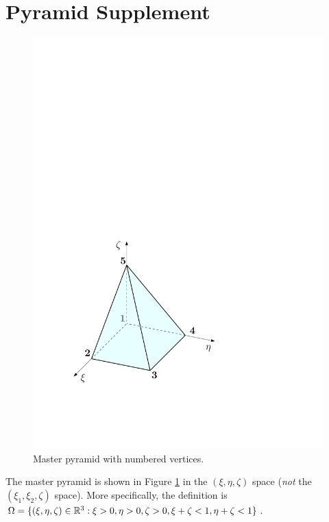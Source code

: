 \section{Pyramid Supplement}
\label{app:pyrappendix}

\begin{figure}[!ht]
\begin{center}
\includegraphics[scale=0.5]{./figures/MasterPyramidAppendix.pdf}
\caption{Master pyramid with numbered vertices.}
\label{fig:MasterPyramidAppendix}
\end{center}
\end{figure}

The master pyramid is shown in Figure \ref{fig:MasterPyramidAppendix} in the $(\xi,\eta,\zeta)$ space (\textit{not} the $(\xi_1,\xi_2,\zeta)$ space).
More specifically, the definition is $\Omega=\{(\xi,\eta,\zeta)\in\mathbb{R}^3:\xi>0,\eta>0,\zeta>0,\xi+\zeta<1,\eta+\zeta<1\}$.

